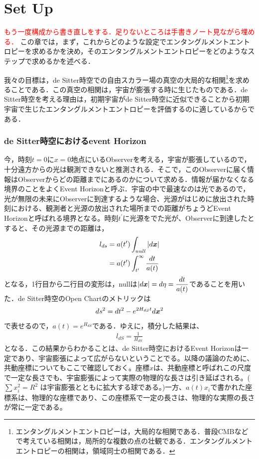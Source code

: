 \section{Set Up}
\textcolor{red}{もう一度構成から書き直しをする．足りないところは手書きノート見ながら埋める．}
この章では，まず，これからどのような設定でエンタングルメントエントロピーを求めるかを決め，そのエンタングルメントエントロピーをどのようなステップで求めるかを述べる．

我々の目標は，de Sitter時空での自由スカラー場の真空の大局的な相関\footnote{エンタングルメントエントロピーは，大局的な相関である．普段CMBなどで考えている相関は，局所的な複数の点の壮観である．エンタングルメントエントロピーの相関は，領域同士の相関である．}を求めることである．この真空の相関は，宇宙が膨張する時に生じたものである．de Sitter時空を考える理由は，初期宇宙がde Sitter時空に近似できることから初期宇宙で生じたエンタングルメントエントロピーを評価するのに適しているからである．
\subsubsection{de Sitter時空におけるevent Horizon}
今，時刻$t=0$に$x=0$地点にいるObserverを考える，宇宙が膨張しているので，十分遠方からの光は観測できないと推測される．そこで，このObserverに届く情報はObserverからどの距離までにあるのかについて求める．情報が届かなくなる境界のことをよくEvent Horizonと呼ぶ．宇宙の中で最速なのは光であるので，光が無限の未来にObserverに到達するような場合、光源がはじめに放出された時刻における、観測者と光源の放出された場所までの距離がちょうどEvent Horizonと呼ばれる境界となる。時刻$t^{\prime}$に光源をでた光が、Observerに到達したとすると、その光源までの距離は，
\begin{align}
  l_{ds}&=a(t^{\prime})\int_{null}|d\mbox{\boldmath$x$}|\\
  &=a(t^{\prime})\int^{\infty}_{t^{\prime}}\frac{dt}{a(t)}
\end{align}
となる，1行目から二行目の変形は，nullは$|d\mbox{\boldmath$x$}|=d\eta=\dfrac{dt}{a(t)}$であることを用いた．de Sitter時空のOpen Chartのメトリックは
\begin{align}
ds^2=dt^2-e^{2H_{dS}t}d\mbox{\boldmath$x$}^2
\end{align}
で表せるので，$a(t)=e^{H_{dS}}$である．ゆえに，積分した結果は、
\begin{align}
l_{dS}=\frac{1}{H_{dS}}
\end{align}
となる．この結果からわかることは、de Sitter時空におけるEvent Horizonは一定であり、宇宙膨張によって広がらないということでる。以降の議論のために、共動座標についてもここで確認しておく。座標$x$は、共動座標と呼ばれこの尺度で一定な長さでも、宇宙膨張によって実際の物理的な長さは引き延ばされる。($\sum x_i^2 = R^2$ は宇宙膨張とともに拡大する球である。)一方、$a(t)x_i$で書かれた座標系は、物理的な座標であり、この座標系で一定の長さは、物理的な実際の長さが常に一定である。

